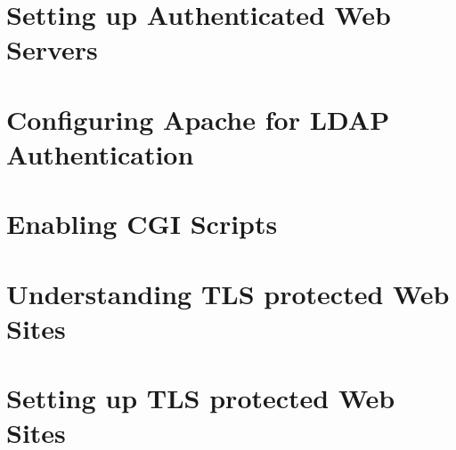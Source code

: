 
\usepackage{minted}
\usepackage{booktabs}


	
	
	\section{Setting up Authenticated Web Servers}
	
	
	\section{Configuring Apache for LDAP Authentication}
	\section{Enabling CGI Scripts}
	\section{Understanding TLS protected Web Sites}
	\section{Setting up TLS protected Web Sites}
	



